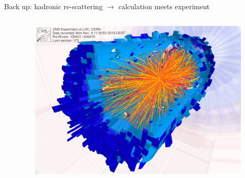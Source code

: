 \documentclass[11pt]{beamer}
\begin{document}
\begin{frame}[noframenumbering]{Back up: hadronic re-scattering $\rightarrow$ calculation meets experiment}
\begin{columns}
\begin{column}{0.6\textwidth}
\begin{itemize}
  \end{itemize}
  \end{column}
  \begin{column}{0.4\textwidth}
      \begin{figure}
   	\begin{center}
   	\includegraphics[width=\textwidth]{pics/CMS.png}
	\end{center} 	
  	\end{figure}
  \end{column}
\end{columns}
\end{frame}
\end{document}

